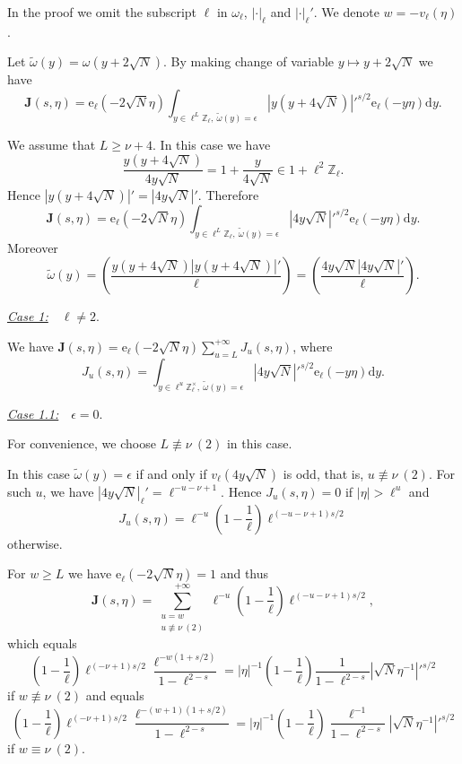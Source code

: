 \documentclass[10pt,oneside,reqno]{amsart}
\makeatletter
\newcommand\rmd{\mathrm{d}}
\newcommand\rme{\mathrm{e}}
\newcommand\bJ{\mathbf{J}}
\newcommand\ZZ{\mathbb{Z}}
\renewcommand\geq{\geqslant}
\newcommand\legendresymbol[2]{\genfrac{(}{)}{}{}{#1}{#2}}
\theoremstyle{THEOREM}
\theoremstyle{DEFINITION}
\theoremstyle{EXERCISE}
\numberwithin{equation}{section}
\renewenvironment{proof}[1][\proofname]{\par
  \vspace{-6pt}
  \pushQED{\qed}
  \normalfont \topsep6\p@\@plus6\p@\relax
  \trivlist
  \item[\hskip\labelsep\rmfamily\bfseries
    #1\@addpunct{:}]\ignorespaces
}{
  \popQED\endtrivlist\@endpefalse
  \vspace{-6pt}
}
\makeatother
\begin{document}
\begin{proof}
In the proof we omit the subscript $\ell$ in $\omega_\ell$, $|\cdot|_\ell$ and $|\cdot|_\ell'$. We denote $w=-v_\ell(\eta)$.

Let $\widetilde{\omega}(y)=\omega(y+2\sqrt{N})$. By making change of variable $y\mapsto y+2\sqrt{N}$ we have
\[
\bJ(s,\eta)=\rme_\ell(-2\sqrt{N}\eta)\int_{y\in\ell^L\ZZ_\ell,\ \widetilde{\omega}(y)=\epsilon}|y(y+4\sqrt{N})|'^{s/2}\rme_\ell(-y\eta)\rmd y.
\]

We assume that $L\geq \nu+4$. In this case we have
\[
\frac{y(y+4\sqrt{N})}{4y\sqrt{N}}=1+\frac{y}{4\sqrt{N}}\in 1+\ell^2\ZZ_\ell.
\]
Hence $|y(y+4\sqrt{N})|'=|4y\sqrt{N}|'$. Therefore
\[
\bJ(s,\eta)=\rme_\ell(-2\sqrt{N}\eta)\int_{y\in\ell^L\ZZ_\ell,\ \widetilde{\omega}(y)=\epsilon}|4y\sqrt{N}|'^{s/2}\rme_\ell(-y\eta)\rmd y.
\]
Moreover
\[
\widetilde{\omega}(y)=\legendresymbol{y(y+4\sqrt{N})|y(y+4\sqrt{N})|'}{\ell}= \legendresymbol{4y\sqrt{N}|4y\sqrt{N}|'}{\ell}.
\]

\underline{\emph{Case 1:}}\ \ $\ell\neq 2$.

We have $\bJ(s,\eta)=\rme_\ell(-2\sqrt{N}\eta)\sum_{u=L}^{+\infty}J_{u}(s,\eta)$, where
\[
J_u(s,\eta)=\int_{y\in\ell^u\ZZ_\ell^\times,\ \widetilde{\omega}(y)=\epsilon}|4y\sqrt{N}|'^{s/2}\rme_\ell(-y\eta)\rmd y.
\]

\underline{\emph{Case 1.1:}}\ \ $\epsilon=0$.

For convenience, we choose $L\not\equiv \nu\ (2)$ in this case. 

In this case $\widetilde{\omega}(y)=\epsilon$ if and only if $v_\ell(4y\sqrt{N})$ is odd, that is, $u\not\equiv \nu \ (2)$. For such $u$, we have $|4y\sqrt{N}|_{\ell}'=\ell^{-u-\nu+1}$. Hence $J_u(s,\eta)=0$ if $|\eta| > \ell^u$ and
\[
J_u(s,\eta)=\ell^{-u}\left(1-\frac{1}{\ell}\right)\ell^{(-u-\nu+1)s/2}
\] 
otherwise.

For $w\geq L$ we have $\rme_\ell(-2\sqrt{N}\eta)=1$ and thus
\[
\bJ(s,\eta)=\sum_{\substack{u=w\\u\not\equiv \nu \ (2)}}^{+\infty}\ell^{-u}\left(1-\frac{1}{\ell}\right)\ell^{(-u-\nu+1)s/2},
\]
which equals
\[
\left(1-\frac{1}{\ell}\right)\ell^{(-\nu+1)s/2}\frac{\ell^{-w(1+s/2)}}{1-\ell^{2-s}}=|\eta|^{-1} \left(1-\frac{1}{\ell}\right)\frac{1}{1-\ell^{2-s}}|\sqrt{N}\eta^{-1}|'^{s/2}
\]
if $w\not\equiv \nu\ (2)$ and equals
\[
\left(1-\frac{1}{\ell}\right)\ell^{(-\nu+1)s/2}\frac{\ell^{-(w+1)(1+s/2)}}{1-\ell^{2-s}}=|\eta|^{-1} \left(1-\frac{1}{\ell}\right)\frac{\ell^{-1}}{1-\ell^{2-s}}|\sqrt{N}\eta^{-1}|'^{s/2}
\]
if $w\equiv \nu\ (2)$.


\end{proof}
\end{document}
